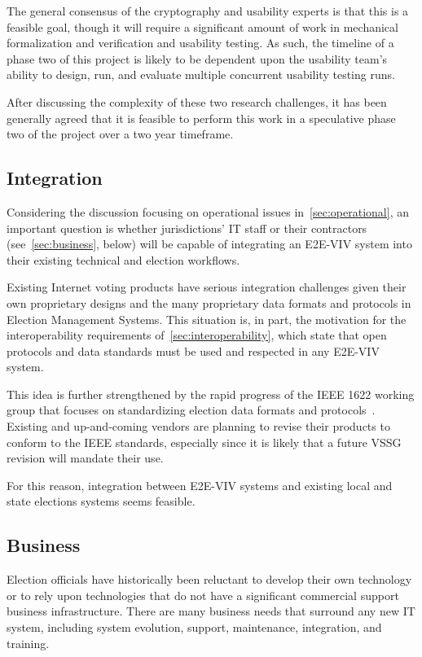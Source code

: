 The general consensus of the cryptography and usability experts is
that this is a feasible goal, though it will require a significant
amount of work in mechanical formalization and verification and
usability testing. As such, the timeline of a phase two of this
project is likely to be dependent upon the usability team's ability to
design, run, and evaluate multiple concurrent usability testing runs.

After discussing the complexity of these two research challenges, it
has been generally agreed that it is feasible to perform this work in
a speculative phase two of the project over a two year timeframe.

\subsection{Integration}

Considering the discussion focusing on operational issues
in~\autoref{sec:operational}, an important question is whether
jurisdictions' IT staff or their contractors
(see~\autoref{sec:business}, below) will be capable of integrating an
E2E-VIV system into their existing technical and election workflows.

Existing Internet voting products have serious integration challenges
given their own proprietary designs and the many proprietary data
formats and protocols in Election Management Systems.  This situation
is, in part, the motivation for the interoperability requirements
of~\autoref{sec:interoperability}, which state that open protocols and
data standards must be used and respected in any E2E-VIV system.

This idea is further strengthened by the rapid progress of the IEEE
1622 working group that focuses on standardizing election data formats
and protocols~\cite{IEEE1622}. Existing and up-and-coming vendors are
planning to revise their products to conform to the IEEE standards,
especially since it is likely that a future VSSG revision will mandate
their use.

For this reason, integration between E2E-VIV systems and existing
local and state elections systems seems feasible.

\subsection{Business}
\label{sec:business}

Election officials have historically been reluctant to develop their
own technology or to rely upon technologies that do not have a
significant commercial support business infrastructure. There are many
business needs that surround any new IT system, including system
evolution, support, maintenance, integration, and training.

